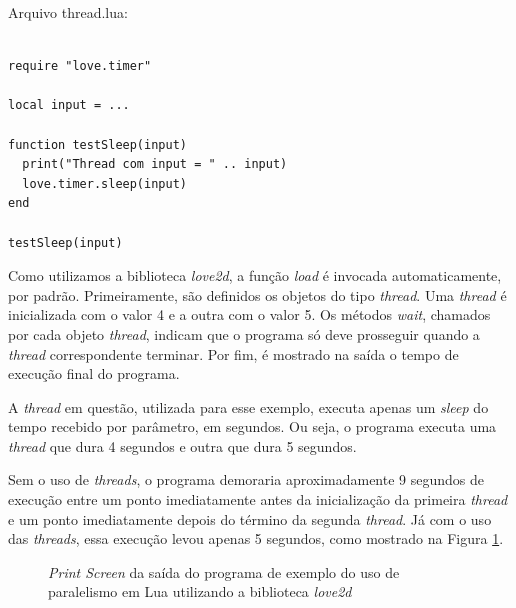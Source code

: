 \documentclass[rel_mlp]{iiufrgs}
\begin{document}
\clearpage

Arquivo thread.lua:

\begin{lstlisting}

require "love.timer"

local input = ...

function testSleep(input)
  print("Thread com input = " .. input)
  love.timer.sleep(input)
end

testSleep(input)

\end{lstlisting}

Como utilizamos a biblioteca \textit{love2d}, a função \textit{load} é invocada automaticamente, por padrão. Primeiramente, são definidos os objetos do tipo \textit{thread}. Uma \textit{thread} é inicializada com o valor 4 e a outra com o valor 5. Os métodos \textit{wait}, chamados por cada objeto \textit{thread}, indicam que o programa só deve prosseguir quando a \textit{thread} correspondente terminar. Por fim, é mostrado na saída o tempo de execução final do programa.

A \textit{thread} em questão, utilizada para esse exemplo, executa apenas um \textit{sleep} do tempo recebido por parâmetro, em segundos. Ou seja, o programa executa uma \textit{thread} que dura 4 segundos e outra que dura 5 segundos.

Sem o uso de \textit{threads}, o programa demoraria aproximadamente 9 segundos de execução entre um ponto imediatamente antes da inicialização da primeira \textit{thread} e um ponto imediatamente depois do término da segunda \textit{thread}. Já com o uso das \textit{threads}, essa execução levou apenas 5 segundos, como mostrado na Figura \ref{fig:Figura2}.

\begin{figure}[H]
     \centering
     \caption{\textit{Print Screen} da saída do programa de exemplo do uso de paralelismo em Lua utilizando a biblioteca \textit{love2d}}
     \label{fig:Figura2}
\end{figure}
\end{document}
